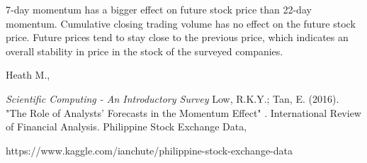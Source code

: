 \documentclass[8pt]{article}
\begin{document}
	7-day momentum has a bigger effect on future stock price than 22-day momentum.
	Cumulative closing trading volume has no effect on the future stock price.
	Future prices tend to stay close to the previous price, which indicates an overall stability in price in the stock of the surveyed companies.

	\begin{thebibliography}{9}
			Heath M.,

			\textit{Scientific Computing - An Introductory Survey}
			Low, R.K.Y.; Tan, E.
			(2016).
			"The Role of Analysts' Forecasts in the Momentum Effect"
			. International Review of Financial Analysis. 
			Philippine Stock Exchange Data,

			https://www.kaggle.com/ianchute/philippine-stock-exchange-data
	\end{thebibliography}
\end{document}
